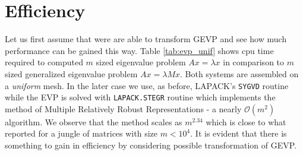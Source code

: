 \documentclass[10pt, a4paper]{article}
\begin{document}
\section*{Efficiency}Let us first assume that were are able to
transform GEVP and see how much performance can be gained this way. Table
\ref{tab:evp_unif} shows cpu time required to computed $m$ sized eigenvalue problem
$Ax=\lambda x$ in comparison to $m$ sized generalized eigenvalue problem
$Ax=\lambda M x$. Both systems are assembled on a \textit{uniform} mesh. In the
later case we use, as before, LAPACK's \texttt{SYGVD} routine while the EVP is
solved with \texttt{LAPACK.STEGR} routine which implements the method of
Multiple Relatively Robust Representations \cite{mmmr} - a nearly
$\mathcal{O}(m^2)$ algorithm. We observe that the method scales as $m^{2.34}$
which is close to what \cite{demmel} reported for a jungle of matrices with size
$m<10^4$. It is evident that there is something to gain in efficiency by considering
possible transformation of GEVP.
%
%
\end{document}
